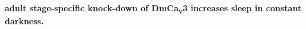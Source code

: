 \label{fig:S}
\textbf{adult stage-specific knock-down of DmCa\textsubscript{v}3 increases sleep in constant darkness.}
\\

